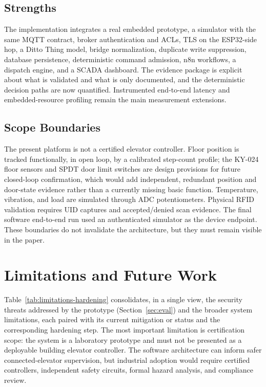 \documentclass[journal]{IEEEtran}
\begin{document}
\subsection{Strengths}

The implementation integrates a real embedded prototype, a simulator with the same MQTT contract, broker authentication and ACLs, TLS on the ESP32-side hop, a Ditto Thing model, bridge normalization, duplicate write suppression, database persistence, deterministic command admission, n8n workflows, a dispatch engine, and a SCADA dashboard. The evidence package is explicit about what is validated and what is only documented, and the deterministic decision paths are now quantified. Instrumented end-to-end latency and embedded-resource profiling remain the main measurement extensions.

\subsection{Scope Boundaries}

The present platform is not a certified elevator controller. Floor position is tracked functionally, in open loop, by a calibrated step-count profile; the KY-024 floor sensors and SPDT door limit switches are design provisions for future closed-loop confirmation, which would add independent, redundant position and door-state evidence rather than a currently missing basic function. Temperature, vibration, and load are simulated through ADC potentiometers. Physical RFID validation requires UID captures and accepted/denied scan evidence. The final software end-to-end run used an authenticated simulator as the device endpoint. These boundaries do not invalidate the architecture, but they must remain visible in the paper.

\section{Limitations and Future Work}
\label{sec:limits}

Table~\ref{tab:limitations-hardening} consolidates, in a single view, the security threats addressed by the prototype (Section~\ref{sec:eval}) and the broader system limitations, each paired with its current mitigation or status and the corresponding hardening step. The most important limitation is certification scope: the system is a laboratory prototype and must not be presented as a deployable building elevator controller. The software architecture can inform safer connected-elevator supervision, but industrial adoption would require certified controllers, independent safety circuits, formal hazard analysis, and compliance review.
\end{document}
